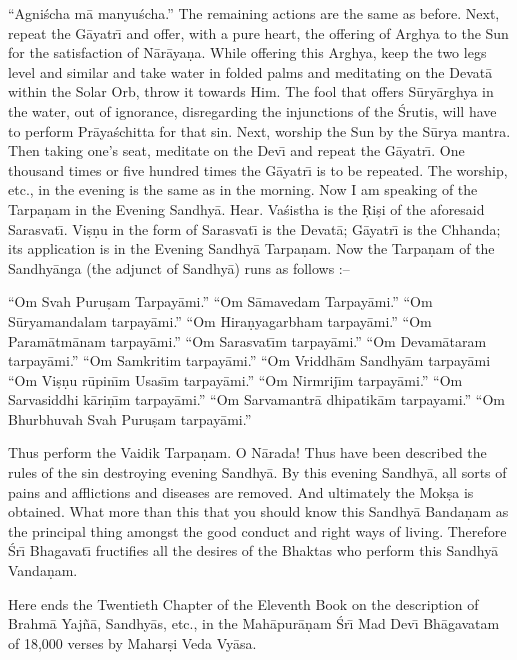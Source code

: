 ``Agni\'scha m\=a manyu\'scha.'' The remaining actions are the same as before. Next, repeat the G\=ayatr\={\i} and offer, with a pure heart, the offering of Arghya to the Sun for the satisfaction of N\=ar\=aya\d{n}a. While offering this Arghya, keep the two legs level and similar and take water in folded palms and meditating on the Devat\=a within the Solar Orb, throw it towards Him. The fool that offers S\=ury\=arghya in the water, out of ignorance, disregarding the injunctions of the \'Srutis, will have to perform Pr\=aya\'schitta for that sin. Next, worship the Sun by the S\=urya mantra. Then taking one's seat, meditate on the Dev\={\i} and repeat the G\=ayatr\={\i}. One thousand times or five hundred times the G\=ayatr\={\i} is to be repeated. The worship, etc., in the evening is the same as in the morning. Now I am speaking of the Tarpa\d{n}am in the Evening Sandhy\=a. Hear. Va\'sistha is the \d{R}i\d{s}i of the aforesaid Sarasvat\={\i}. Vi\d{s}\d{n}u in the form of Sarasvat\={\i} is the Devat\=a; G\=ayatr\={\i} is the Chhanda; its application is in the Evening Sandhy\=a Tarpa\d{n}am. Now the Tarpa\d{n}am of the Sandhy\=anga (the adjunct of Sandhy\=a) runs as follows :--

``Om Svah Puru\d{s}am Tarpay\=ami.''
``Om S\=amavedam Tarpay\=ami.''
``Om S\=uryamandalam tarpay\=ami.''
``Om Hira\d{n}yagarbham tarpay\=ami.''
``Om Param\=atm\=anam tarpay\=ami.''
``Om Sarasvat\={\i}m tarpay\=ami.''
``Om Devam\=ataram tarpay\=ami.''
``Om Samkritim tarpay\=ami.''
``Om Vriddh\=am Sandhy\=am tarpay\=ami
``Om Vi\d{s}\d{n}u r\=upin\={\i}m Usas\={\i}m tarpay\=ami.''
``Om Nirmrij\={\i}m tarpay\=ami.''
``Om Sarvasiddhi k\=ari\d{n}\={\i}m tarpay\=ami.''
``Om Sarvamantr\=a dhipatik\=am tarpayami.''
``Om Bhurbhuvah Svah Puru\d{s}am tarpay\=ami.''

Thus perform the Vaidik Tarpa\d{n}am. O N\=arada! Thus have been described the rules of the sin destroying evening Sandhy\=a. By this evening Sandhy\=a, all sorts of pains and afflictions and diseases are removed. And ultimately the Mok\d{s}a is obtained. What more than this that you should know this Sandhy\=a Banda\d{n}am as the principal thing amongst the good conduct and right ways of living. Therefore \'Sr\={\i} Bhagavat\={\i} fructifies all the desires of the Bhaktas who perform this Sandhy\=a Vanda\d{n}am.

Here ends the Twentieth Chapter of the Eleventh Book on the description of Brahm\=a Yaj\~n\=a, Sandhy\=as, etc., in the Mah\=apur\=a\d{n}am \'Sr\={\i} Mad Dev\={\i} Bh\=agavatam of 18,000 verses by Mahar\d{s}i Veda Vy\=asa.



